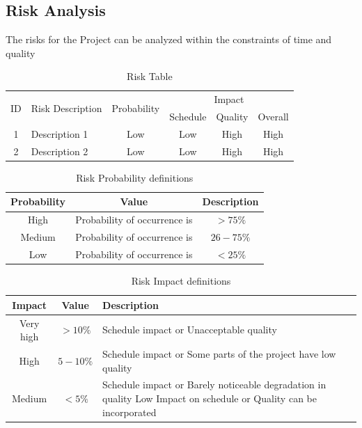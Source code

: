 \documentclass[oneside,a4paper,12pt]{report}
\begin{document}
\subsection{Risk Analysis}
The risks for the Project can be analyzed within the constraints of time and quality

\begin{table}[!htbp]
\begin{center}
\def\arraystretch{1.5}
\begin{tabularx}{\textwidth}{| c | X | c | c | c | c |}
\hline
\multirow{2}{*}{ID} & \multirow{2}{*}{Risk Description}	& \multirow{2}{*}{Probability} & \multicolumn{3}{|c|}{Impact} \\ \cline{4-6}
	& & &	Schedule	& Quality	& Overall \\ \hline
1	& Description 1	& Low	& Low	& High	& High \\ \hline
2	& Description 2	& Low	& Low	& High	& High \\ \hline
\end{tabularx}
\end{center}
\caption{Risk Table}
\label{tab:risk}
\end{table}


\begin{table}[!htbp]
\begin{center}
\def\arraystretch{1.5}
\begin{tabular}{| c | c | c |}
\hline
Probability & Value &	Description \\ \hline
High &	Probability of occurrence is &  $ > 75 \% $ \\ \hline
Medium &	Probability of occurrence is  & $26-75 \% $ \\ \hline
Low	& Probability of occurrence is & $ < 25 \% $ \\ \hline
\end{tabular}
\end{center}
\caption{Risk Probability definitions \cite{bookPressman}}
\label{tab:riskdef}
\end{table}

\begin{table}[!htbp]
\begin{center}
\def\arraystretch{1.5}
\begin{tabularx}{\textwidth}{| c | c | X |}
\hline
Impact & Value	& Description \\ \hline
Very high &	$> 10 \%$ & Schedule impact or Unacceptable quality \\ \hline
High &	$5-10 \%$ & Schedule impact or Some parts of the project have low quality \\ \hline
Medium	& $ < 5 \% $ & Schedule impact or Barely noticeable degradation in quality Low	Impact on schedule or Quality can be incorporated \\ \hline
\end{tabularx}
\end{center}
\caption{Risk Impact definitions \cite{bookPressman}}
\label{tab:riskImpactDef}
\end{table}
\end{document}
